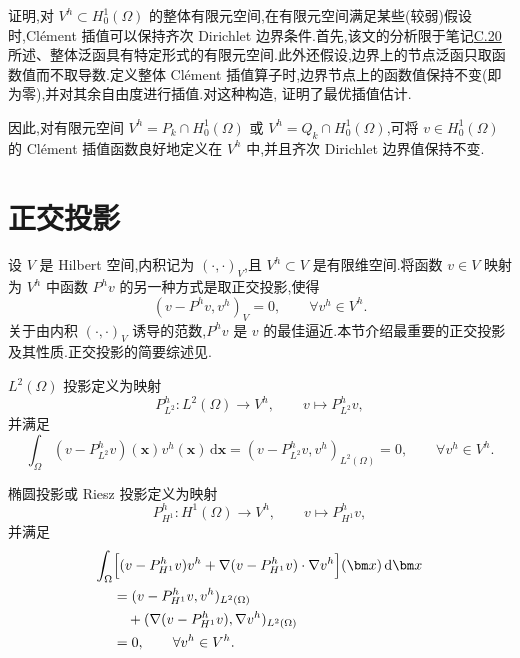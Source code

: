\begin{note}\label{note:appendix-c-22}
\textcite{Clement1975} 证明,对 $V^h\subset H_0^1(\Omega)$ 的整体有限元空间,在有限元空间满足某些(较弱)假设时,Clément 插值可以保持齐次 Dirichlet 边界条件.首先,该文的分析限于笔记\hyperref[note:appendix-c-20]{C.20} 所述、整体泛函具有特定形式的有限元空间.此外还假设,边界上的节点泛函只取函数值而不取导数.定义整体 Clément 插值算子时,边界节点上的函数值保持不变(即为零),并对其余自由度进行插值.对这种构造,\textcite{Clement1975} 证明了最优插值估计.

因此,对有限元空间 $V^h=P_k\cap H_0^1(\Omega)$ 或
$V^h=Q_k\cap H_0^1(\Omega)$,可将 $v\in H_0^1(\Omega)$ 的 Clément 插值函数良好地定义在 $V^h$ 中,并且齐次 Dirichlet 边界值保持不变.
\end{note}

\section{正交投影}\label{sec:appendix-c-3}

\begin{note}[关于正交投影]\label{note:appendix-c-23}
设 $V$ 是 Hilbert 空间,内积记为 $(\cdot,\cdot)_V$,且 $V^h\subset V$ 是有限维空间.将函数 $v\in V$ 映射为 $V^h$ 中函数 $P^h v$ 的另一种方式是取正交投影,使得
\[
 (v-P^h v,v^h)_V=0,\qquad \forall v^h\in V^h.
\]
关于由内积 $(\cdot,\cdot)_V$ 诱导的范数,$P^h v$ 是 $v$ 的最佳逼近.本节介绍最重要的正交投影及其性质.正交投影的简要综述见\textcite[第 1.6.3 节]{ErnGuermond2004}.
\end{note}

\begin{definition}[$L^2(\Omega)$ 投影]\label{def:appendix-c-24}
$L^2(\Omega)$ 投影定义为映射
\[
 P^h_{L^2}:L^2(\Omega)\to V^h,\qquad v\mapsto P^h_{L^2}v,
\]
并满足
\begin{equation}\label{eq:appendix-c-25}
 \int_\Omega(v-P^h_{L^2}v)(\bm x)v^h(\bm x)\,\mathrm d\bm x
 =(v-P^h_{L^2}v,v^h)_{L^2(\Omega)}=0,
 \qquad \forall v^h\in V^h.
\end{equation}
\end{definition}

\begin{definition}\label{def:appendix-c-25}
椭圆投影或 Riesz 投影定义为映射
\[
 P^h_{H^1}:H^1(\Omega)\to V^h,\qquad v\mapsto P^h_{H^1}v,
\]
并满足
\[
\begin{aligned}
 \int_\Omega&\Bigl[(v-P^h_{H^1}v)v^h
  +\nabla(v-P^h_{H^1}v)\cdot\nabla v^h\Bigr](\bm x)\,
  \mathrm d\bm x\\
  &=(v-P^h_{H^1}v,v^h)_{L^2(\Omega)}\\
  &\quad+(\nabla(v-P^h_{H^1}v),\nabla v^h)_{L^2(\Omega)}\\
  &=0,\qquad \forall v^h\in V^h.
\end{aligned}
\]
\end{definition}

